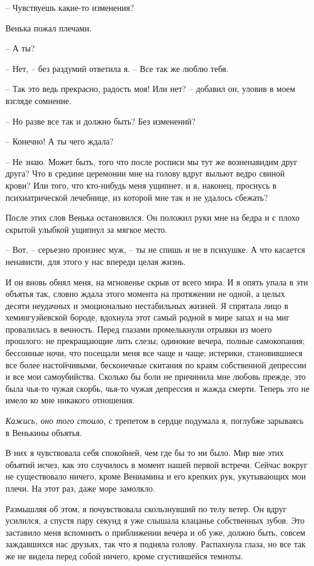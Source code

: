 \documentclass[
]{book}
\begin{document}
-- Чувствуешь какие-то изменения?

Венька пожал плечами.

-- А ты?

-- Нет, -- без раздумий ответила я. -- Все так же люблю тебя.

-- Так это ведь прекрасно, радость моя! Или нет? -- добавил он, уловив в моем взгляде сомнение.

-- Но разве все так и должно быть? Без изменений?

-- Конечно! А ты чего ждала?

-- Не знаю. Может быть, того что после росписи мы тут же возненавидим друг друга? Что в средине церемонии мне на голову вдруг выльют ведро свиной крови? Или того, что кто-нибудь меня ущипнет, и я, наконец, проснусь в психиатрической лечебнице, из которой мне так и не удалось сбежать?

После этих слов Венька остановился. Он положил руки мне на бедра и с плохо скрытой улыбкой ущипнул за мягкое место.

-- Вот, -- серьезно произнес муж, -- ты не спишь и не в психушке. А что касается ненависти, для этого у нас впереди целая жизнь.

И он вновь обнял меня, на мгновенье скрыв от всего мира. И я опять упала в эти объятья так, словно ждала этого момента на протяжении не одной, а целых десяти неудачных и эмоционально нестабильных жизней. Я спрятала лицо в хемингуэйевской бороде, вдохнула этот самый родной в мире запах и на миг провалилась в вечность. Перед глазами промелькнули отрывки из моего прошлого: не прекращающие лить слезы; одинокие вечера, полные самокопания; бессонные ночи, что посещали меня все чаще и чаще; истерики, становившиеся все более настойчивыми, бесконечные скитания по краям собственной депрессии и все мои самоубийства. Сколько бы боли не причинила мне любовь прежде, это была чья-то чужая скорбь, чья-то чужая депрессия и жажда смерти. Теперь это не имело ко мне никакого отношения.

\emph{Кажись, оно того стоило}, с трепетом в сердце подумала я, поглубже зарываясь в Венькины объятья.

В них я чувствовала себя спокойней, чем где бы то ни было. Мир вне этих объятий исчез, как это случилось в момент нашей первой встречи. Сейчас вокруг не существовало ничего, кроме Вениамина и его крепких рук, укутывающих мои плечи. На этот раз, даже море замолкло.

Размышляя об этом, я почувствовала скользнувший по телу ветер. Он вдруг усилился, а спустя пару секунд я уже слышала клацанье собственных зубов. Это заставило меня вспомнить о приближении вечера и об уже, должно быть, совсем заждавшихся нас друзьях, так что я подняла голову. Распахнула глаза, но все так же не видела перед собой ничего, кроме сгустившейся темноты.
\end{document}
